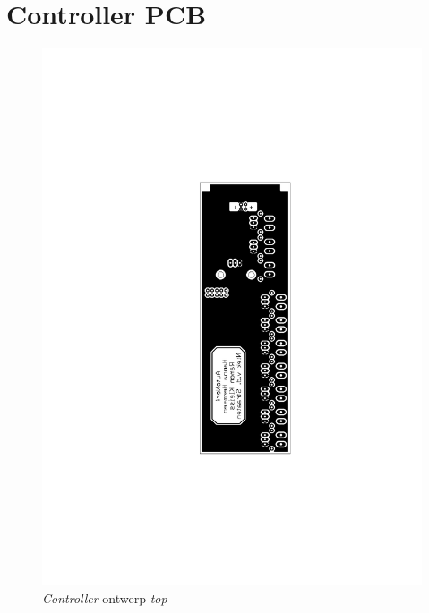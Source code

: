\chapter{Controller PCB}
\label{app:launcher-pcb}

\begin{figure}
    \includegraphics[scale=0.75]{figures/controller_top.pdf}
    \caption{\emph{Controller} ontwerp \emph{top}}
\end{figure}

